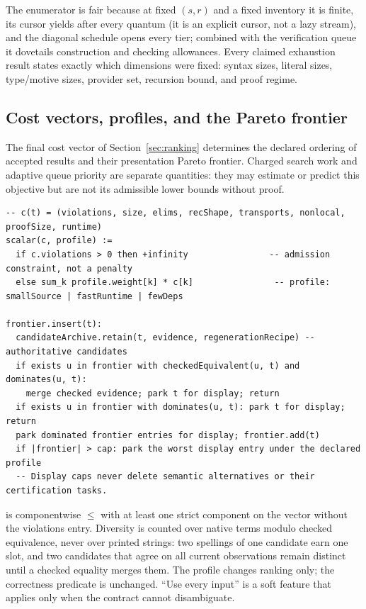 The enumerator is fair because at fixed $(s,r)$ and a fixed inventory it is finite, its cursor yields after every quantum (it is an explicit cursor, not a lazy stream), and the diagonal schedule opens every tier; combined with the verification queue it dovetails construction and checking allowances. Every claimed exhaustion result states exactly which dimensions were fixed: syntax sizes, literal sizes, type/motive sizes, provider set, recursion bound, and proof regime.

\subsection{Cost vectors, profiles, and the Pareto frontier}\label{alg:cost}

The final cost vector of Section~\ref{sec:ranking} determines the declared ordering of accepted results and their presentation Pareto frontier. Charged search work and adaptive queue priority are separate quantities: they may estimate or predict this objective but are not its admissible lower bounds without proof.
\begin{lstlisting}
-- c(t) = (violations, size, elims, recShape, transports, nonlocal, proofSize, runtime)
scalar(c, profile) :=
  if c.violations > 0 then +infinity                -- admission constraint, not a penalty
  else sum_k profile.weight[k] * c[k]                -- profile: smallSource | fastRuntime | fewDeps

frontier.insert(t):
  candidateArchive.retain(t, evidence, regenerationRecipe) -- authoritative candidates
  if exists u in frontier with checkedEquivalent(u, t) and dominates(u, t):
    merge checked evidence; park t for display; return
  if exists u in frontier with dominates(u, t): park t for display; return
  park dominated frontier entries for display; frontier.add(t)
  if |frontier| > cap: park the worst display entry under the declared profile
  -- Display caps never delete semantic alternatives or their certification tasks.
\end{lstlisting}
 is componentwise $\le$ with at least one strict component on the vector without the violations entry. Diversity is counted over native terms modulo checked equivalence, never over printed strings: two spellings of one candidate earn one slot, and two candidates that agree on all current observations remain distinct until a checked equality merges them. The profile changes ranking only; the correctness predicate is unchanged. ``Use every input'' is a soft feature that applies only when the contract cannot disambiguate.

